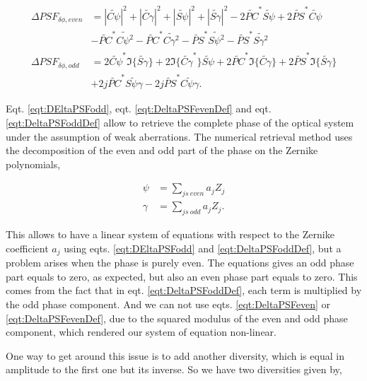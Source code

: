 \begin{align}
\Delta PSF_{\delta\phi, even} &= |\widetilde{C\psi}|^2 + |\widetilde{C\gamma}|^2 +|\widetilde{S\psi}|^2 + |\widetilde{S\gamma}|^2 -2\widetilde{PC}^*\widetilde{S\psi}+2\widetilde{PS}^*\widetilde{C\psi} \nonumber\\
&-\widetilde{PC}^*\widetilde{C\psi^2}-\widetilde{PC}^*\widetilde{C\gamma^2}-\widetilde{PS}^*\widetilde{S\psi^2}-\widetilde{PS}^*\widetilde{S\gamma^2} \label{eqt:DeltaPSFevenDef}\\
\Delta PSF_{\delta\phi, odd} &= 2\widetilde{C\psi}^*\Im\lbrace\widetilde{S\gamma}\rbrace+2\Im\lbrace\widetilde{C\gamma}^*\rbrace\widetilde{S\psi}+2\widetilde{PC}^*\Im\lbrace\widetilde{C\gamma}\rbrace+2\widetilde{PS}^*\Im\lbrace\widetilde{S\gamma}\rbrace \nonumber\\
&+2j\widetilde{PC}^*\widetilde{S\psi\gamma}-2j\widetilde{PS}^*\widetilde{C\psi\gamma}.\label{eqt:DeltaPSFoddDef}
\end{align}

Eqt. \eqref{eqt:DEltaPSFodd}, eqt. \eqref{eqt:DeltaPSFevenDef} and eqt. \eqref{eqt:DeltaPSFoddDef} allow to retrieve the complete phase of the optical system under the assumption of weak aberrations. The numerical retrieval method uses the decomposition of the even and odd part of the phase on the Zernike polynomials,

\begin{align}
\psi &= \sum\limits_{js\ even} a_j Z_j \label{eqt:evenPhaseDecomp}\\
\gamma &= \sum\limits_{js\ odd} a_j Z_j. \label{eqt:oddPhaseDecomp}
\end{align}

This allows to have a linear system of equations with respect to the Zernike coefficient $a_j$ using eqts. \eqref{eqt:DEltaPSFodd} and \eqref{eqt:DeltaPSFoddDef}, but a problem arises when the phase is purely even. The equations gives an odd phase part equals to zero, as expected, but also an even phase part equals to zero. This comes from the fact that in eqt. \eqref{eqt:DeltaPSFoddDef}, each term is multiplied by the odd phase component. And we can not use eqts. \eqref{eqt:DeltaPSFeven} or \eqref{eqt:DeltaPSFevenDef}, due to the squared modulus of the even and odd phase component, which rendered our system of equation non-linear.

One way to get around this issue is to add another diversity, which is equal in amplitude to the first one but its inverse. So we have two diversities given by,

